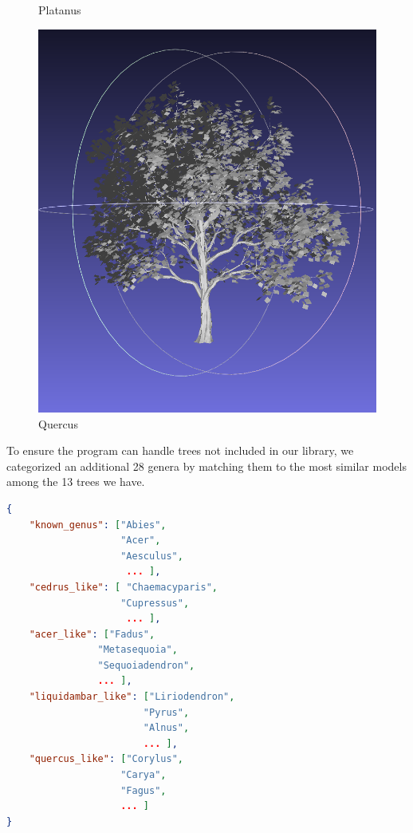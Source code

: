 \documentclass[12pt]{article}
\begin{document}
\begin{figure}[H]
\begin{minipage}{0.24\textwidth}
        \caption{Platanus}
    \end{minipage}\hfill
    \begin{minipage}{0.24\textwidth}
        \centering
        \includegraphics[width=\textwidth]{images/quercus.png}
        \caption{Quercus}
    \end{minipage}
\end{figure}

\newpage

To ensure the program can handle trees not included in our library, we
categorized an additional 28 genera by matching them to the most similar
models among the 13 trees we have.

\begin{lstlisting}[language=json]
{
    "known_genus": ["Abies",
                    "Acer",
                    "Aesculus",
                     ... ],
    "cedrus_like": [ "Chaemacyparis",
                    "Cupressus",
                     ... ],
    "acer_like": ["Fadus",
                "Metasequoia",
                "Sequoiadendron",
                ... ],
    "liquidambar_like": ["Liriodendron",
                        "Pyrus",
                        "Alnus",
                        ... ],
    "quercus_like": ["Corylus",
                    "Carya",
                    "Fagus",
                    ... ]
}
\end{lstlisting}
\end{document}
